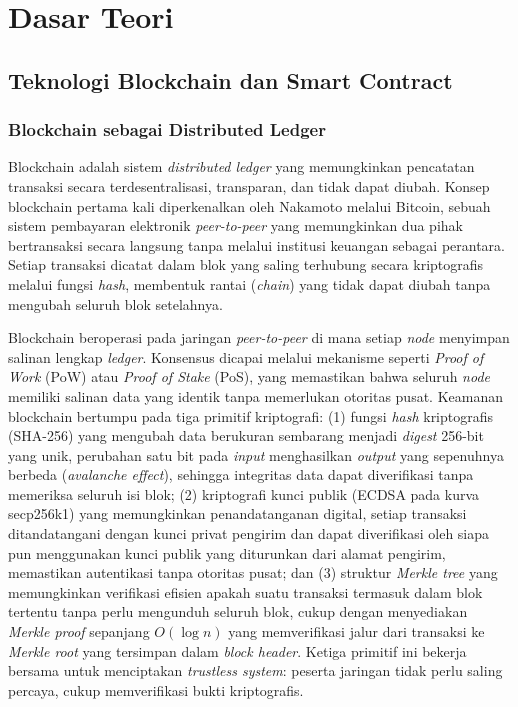 \section{Dasar Teori}
\subsection{Teknologi Blockchain dan Smart Contract}

\subsubsection{Blockchain sebagai Distributed Ledger}

Blockchain adalah sistem \textit{distributed ledger} yang memungkinkan pencatatan transaksi secara terdesentralisasi, transparan, dan tidak dapat diubah. Konsep blockchain pertama kali diperkenalkan oleh Nakamoto \cite{nakamoto2008bitcoin} melalui Bitcoin, sebuah sistem pembayaran elektronik \textit{peer-to-peer} yang memungkinkan dua pihak bertransaksi secara langsung tanpa melalui institusi keuangan sebagai perantara. Setiap transaksi dicatat dalam blok yang saling terhubung secara kriptografis melalui fungsi \textit{hash}, membentuk rantai (\textit{chain}) yang tidak dapat diubah tanpa mengubah seluruh blok setelahnya.

Blockchain beroperasi pada jaringan \textit{peer-to-peer} di mana setiap \textit{node} menyimpan salinan lengkap \textit{ledger}. Konsensus dicapai melalui mekanisme seperti \textit{Proof of Work} (PoW) atau \textit{Proof of Stake} (PoS), yang memastikan bahwa seluruh \textit{node} memiliki salinan data yang identik tanpa memerlukan otoritas pusat. Keamanan blockchain bertumpu pada tiga primitif kriptografi: (1) fungsi \textit{hash} kriptografis (SHA-256) yang mengubah data berukuran sembarang menjadi \textit{digest} 256-bit yang unik, perubahan satu bit pada \textit{input} menghasilkan \textit{output} yang sepenuhnya berbeda (\textit{avalanche effect}), sehingga integritas data dapat diverifikasi tanpa memeriksa seluruh isi blok; (2) kriptografi kunci publik (ECDSA pada kurva secp256k1) yang memungkinkan penandatanganan digital, setiap transaksi ditandatangani dengan kunci privat pengirim dan dapat diverifikasi oleh siapa pun menggunakan kunci publik yang diturunkan dari alamat pengirim, memastikan autentikasi tanpa otoritas pusat; dan (3) struktur \textit{Merkle tree} yang memungkinkan verifikasi efisien apakah suatu transaksi termasuk dalam blok tertentu tanpa perlu mengunduh seluruh blok, cukup dengan menyediakan \textit{Merkle proof} sepanjang $O(\log n)$ yang memverifikasi jalur dari transaksi ke \textit{Merkle root} yang tersimpan dalam \textit{block header}. Ketiga primitif ini bekerja bersama untuk menciptakan \textit{trustless system}: peserta jaringan tidak perlu saling percaya, cukup memverifikasi bukti kriptografis.


